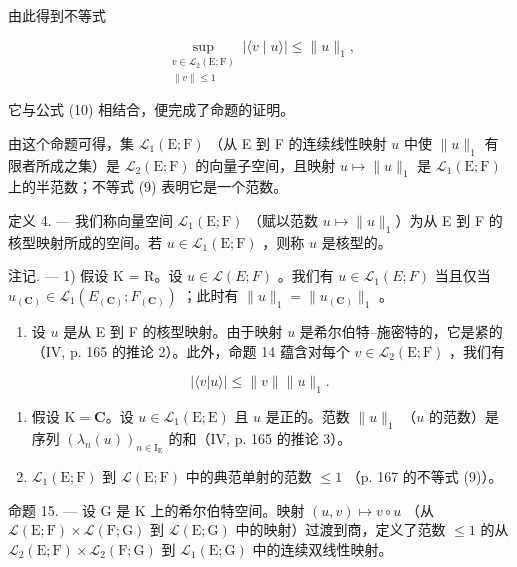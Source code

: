 由此得到不等式

\[
\sup_{\substack{v\in \mathcal{L}_{2}(\mathrm{E};\mathrm{F})\\ \| v\| \leqslant 1}}|\langle v\mid u\rangle |\leqslant \| u\|_{1},
\]

它与公式 (10) 相结合，便完成了命题的证明。

由这个命题可得，集 \(\mathcal{L}_1(\mathrm{E};\mathrm{F})\) （从 E 到 F 的连续线性映射 \(u\) 中使 \(\| u\| _1\) 有限者所成之集）是 \(\mathcal{L}_{2}(\mathrm{E};\mathrm{F})\) 的向量子空间，且映射 \(u\mapsto \| u\| _1\) 是 \(\mathcal{L}_1(\mathrm{E};\mathrm{F})\) 上的半范数；不等式 (9) 表明它是一个范数。

定义 4. --- 我们称向量空间 \(\mathcal{L}_{1}(\mathrm{E};\mathrm{F})\) （赋以范数 \(u\mapsto \| u\|_{1}\)）为从 E 到 F 的核型映射所成的空间。若 \(u\in \mathcal{L}_1(\mathrm{E};\mathrm{F})\) ，则称 \(u\) 是核型的。

注记. --- 1) 假设 K = R。设 \(u \in \mathcal{L}(E; F)\) 。我们有 \(u \in \mathcal{L}_{1}(E; F)\) 当且仅当 \(u_{(\mathbf{C})} \in \mathcal{L}_{1}(E_{(\mathbf{C})}; F_{(\mathbf{C})})\) ；此时有 \(\|u\|_{1} = \|u_{(\mathbf{C})}\|_{1}\) 。

\begin{enumerate}
\def\labelenumi{\arabic{enumi})}
\setcounter{enumi}{1}
\tightlist
\item
  设 \(u\) 是从 E 到 F 的核型映射。由于映射 \(u\) 是希尔伯特--施密特的，它是紧的（IV, p. 165 的推论 2）。此外，命题 14 蕴含对每个 \(v \in \mathcal{L}_2(\mathrm{E};\mathrm{F})\) ，我们有
\end{enumerate}

\[
| \langle v | u \rangle | \leqslant \| v \| \| u \| _ {1}.\tag{11}
\]

\begin{enumerate}
\def\labelenumi{\arabic{enumi})}
\setcounter{enumi}{2}
\item
  假设 \(\mathrm{K} = \mathbf{C}\)。设 \(u \in \mathcal{L}_1(\mathrm{E};\mathrm{E})\) 且 \(u\) 是正的。范数 \(\| u\| _1\) （\(u\) 的范数）是序列 \((\lambda_n(u))_{n\in \mathrm{I_E}}\) 的和（IV, p. 165 的推论 3）。
\item
  \(\mathcal{L}_1(\mathrm{E};\mathrm{F})\) 到 \(\mathcal{L}(\mathrm{E};\mathrm{F})\) 中的典范单射的范数 \(\leqslant 1\) （p. 167 的不等式 (9)）。
\end{enumerate}

命题 15. --- 设 G 是 K 上的希尔伯特空间。映射 \((u,v)\mapsto v\circ u\) （从 \(\mathcal{L}(\mathrm{E};\mathrm{F})\times\mathcal{L}(\mathrm{F};\mathrm{G})\) 到 \(\mathcal{L}(\mathrm{E};\mathrm{G})\) 中的映射）过渡到商，定义了范数 \(\leqslant1\) 的从 \(\mathcal{L}_{2}(\mathrm{E};\mathrm{F})\times\mathcal{L}_{2}(\mathrm{F};\mathrm{G})\) 到 \(\mathcal{L}_{1}(\mathrm{E};\mathrm{G})\) 中的连续双线性映射。

